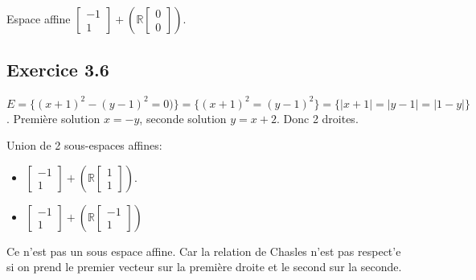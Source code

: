 \documentclass[]{book}
\theoremstyle{definition}
\newcommand{\bb}[1]{\mathbb{#1}}
\newcommand{\R}{\bb{R}}
\begin{document}
Espace affine $\begin{bmatrix} -1 \\ 1 \end{bmatrix} + (\R \begin{bmatrix} 0 \\ 0 \end{bmatrix})$.

\subsection*{Exercice 3.6}
$E= \{ (x+1)^2 - (y-1)^2 = 0)\} = \{ (x+1)^2 = (y-1)^2\} = \{ |x+1| = |y-1| = |1-y|\}$. Premi\`ere solution $x=-y$, seconde solution $y = x+2$. Donc 2 droites.


Union de 2 sous-espaces affines:
\begin{itemize}
    \item $\begin{bmatrix} -1 \\ 1 \end{bmatrix} + (\R \begin{bmatrix} 1 \\ 1 \end{bmatrix})$.
    \item $\begin{bmatrix} -1 \\ 1 \end{bmatrix} + (\R \begin{bmatrix} -1 \\ 1 \end{bmatrix})$
\end{itemize}
Ce n'est pas un sous espace affine. Car la relation de Chasles n'est pas respect'e si on prend le premier vecteur sur la premi\`ere droite et le second sur la seconde.
\end{document}
